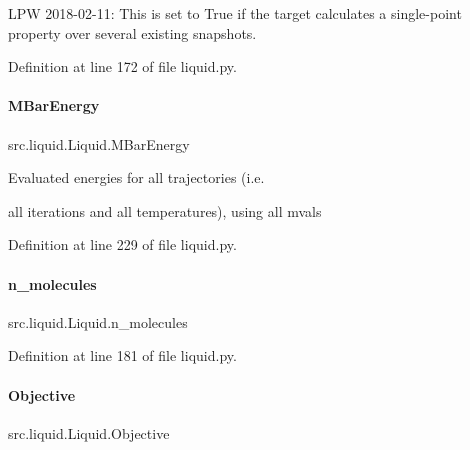 L\+PW 2018-\/02-\/11\+: This is set to True if the target calculates a single-\/point property over several existing snapshots. 



Definition at line 172 of file liquid.\+py.

\mbox{\label{classsrc_1_1liquid_1_1Liquid_aef2366a4e32f76e5c9c2657ee81b8d0c}} 
\paragraph{\texorpdfstring{M\+Bar\+Energy}{MBarEnergy}}
{\footnotesize\ttfamily src.\+liquid.\+Liquid.\+M\+Bar\+Energy}



Evaluated energies for all trajectories (i.\+e. 

all iterations and all temperatures), using all mvals 

Definition at line 229 of file liquid.\+py.

\mbox{\label{classsrc_1_1liquid_1_1Liquid_a0e3e31fe5612fc358781b86f0a2a2241}} 
\paragraph{\texorpdfstring{n\+\_\+molecules}{n\_molecules}}
{\footnotesize\ttfamily src.\+liquid.\+Liquid.\+n\+\_\+molecules}



Definition at line 181 of file liquid.\+py.

\mbox{\label{classsrc_1_1liquid_1_1Liquid_afa4318bb1f833e5891262e3814408c0b}} 
\paragraph{\texorpdfstring{Objective}{Objective}}
{\footnotesize\ttfamily src.\+liquid.\+Liquid.\+Objective}



